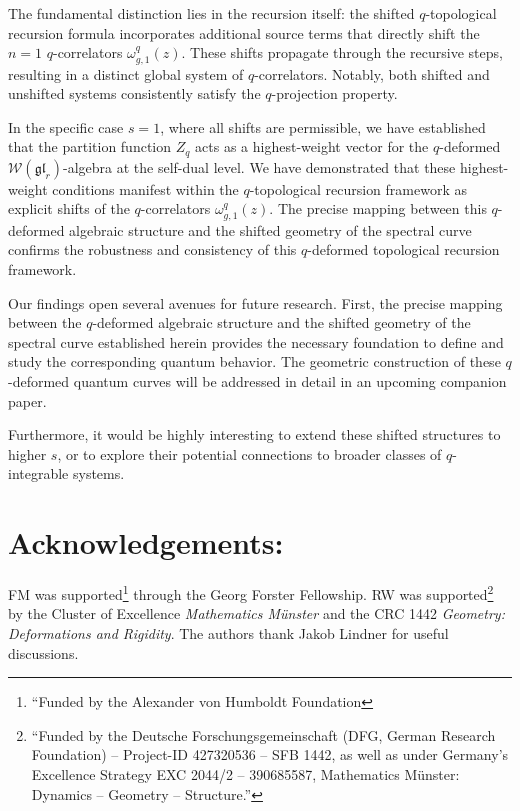 \documentclass[reqno,11pt]{amsart}
\theoremstyle{plain}
\theoremstyle{definition}
\theoremstyle{remark}
\numberwithin{equation}{section}
\newcommand{\1}{\mathds{1}}
\newcommand{\2}{\frac{1}{2}}
\begin{document}
{								The fundamental distinction lies in the recursion itself: the shifted $q$-topological recursion formula incorporates additional source terms that directly shift the $n=1$ $q$-correlators $\omega^{q}_{g,1}(z)$. These shifts propagate through the recursive steps, resulting in a distinct global system of $q$-correlators. Notably, both shifted and unshifted systems consistently satisfy the $q$-projection property.
								
								In the specific case $s=1$, where all shifts are permissible, we have established that the partition function $Z_q$ acts as a highest-weight vector for the $q$-deformed $\mathcal{W}(\mathfrak{gl}_r)$-algebra at the self-dual level. We have demonstrated that these highest-weight conditions manifest within the $q$-topological recursion framework as explicit shifts of the $q$-correlators $\omega^{q}_{g,1}(z)$. The precise mapping between this $q$-deformed algebraic structure and the shifted geometry of the spectral curve confirms the robustness and consistency of this $q$-deformed topological recursion framework.
								
								
								{Our findings open several avenues for future research. First, the precise mapping between the $q$-deformed algebraic structure and the shifted geometry of the spectral curve established herein provides the necessary foundation to define and study the corresponding quantum behavior. The geometric construction of these $q$-deformed quantum curves will be addressed in detail in an upcoming companion paper. 
									
									Furthermore, it would be highly interesting to extend these shifted structures to higher $s$, or to explore their potential connections to broader classes of $q$-integrable systems.}
				
				\section{Acknowledgements:}
				FM was supported\footnote{``Funded by the Alexander von Humboldt Foundation} through  the Georg Forster
				Fellowship.  
				RW was supported\footnote{``Funded by the Deutsche Forschungsgemeinschaft (DFG, German Research
					Foundation) -- Project-ID 427320536 -- SFB 1442, as well as under
					Germany's Excellence Strategy EXC 2044/2 -- 390685587, Mathematics
					M\"unster: Dynamics -- Geometry -- Structure.''} by the Cluster of Excellence
				\emph{Mathematics M\"unster} and the CRC 1442 \emph{Geometry:
					Deformations and Rigidity}. The authors thank Jakob Lindner for useful discussions.
}
\end{document}
